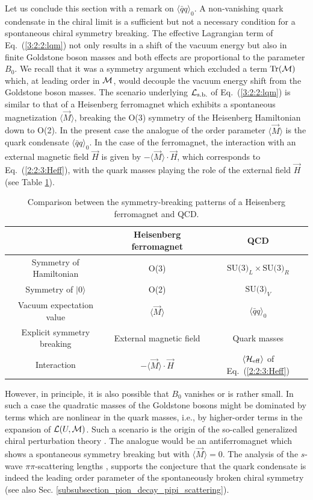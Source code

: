 \documentclass[twoside,12pt]{article}
\begin{document}
   Let us conclude this section with a remark on $\langle\bar{q}q\rangle_0$.
   A non-vanishing quark condensate in the chiral
limit is a sufficient but not a necessary condition for a spontaneous
chiral symmetry breaking.
   The effective Lagrangian term of Eq.\ (\ref{3:2:2:lqm}) not only results in
a shift of the vacuum energy but also in finite Goldstone boson
masses and both effects are proportional to the parameter
$B_0$.
   We recall that it was
a symmetry argument which excluded a term $\mbox{Tr}({\cal M})$ which,
at leading order in ${\cal M}$, would decouple the vacuum energy shift
from the Goldstone boson masses.
   The scenario underlying ${\cal L}_{\rm s.b.}$ of Eq.\ (\ref{3:2:2:lqm})
is similar to that of a Heisenberg ferromagnet which exhibits a
spontaneous magnetization $\langle \vec{M}\rangle$, breaking the
O(3) symmetry of the Heisenberg Hamiltonian down to O(2).
   In the present case the analogue of the order parameter
$\langle \vec{M}\rangle$ is the quark condensate $\langle \bar{q} q\rangle_0$.
   In the case of the ferromagnet, the interaction with an external magnetic
field $\vec{H}$ is given by $-\langle \vec{M}\rangle\cdot \vec{H}$, which corresponds
to Eq.\ (\ref{2:2:3:Heff}), with the quark masses playing the role of the
external field $\vec{H}$ (see Table \ref{3:2:2:table_analogy}).
\begin{table}[t]
\begin{center}
{\renewcommand{\baselinestretch}{1.5}\small\normalsize
\begin{tabular}{c|c|c}
& Heisenberg ferromagnet & QCD\\
\hline
Symmetry of Hamiltonian & O(3) & $\mbox{SU(3)}_L\times\mbox{SU(3)}_R$\\
Symmetry of $|0\rangle$ & O(2) & $\mbox{SU(3)}_V$\\
Vacuum expectation value & $\langle \vec{M}\rangle$ & $\langle
\bar{q} q\rangle_0$\\
Explicit symmetry breaking & External magnetic field & Quark
masses\\
Interaction &$-\langle \vec{M}\rangle\cdot \vec{H}$&$\langle{\cal
H}_{\rm eff}\rangle$ of Eq.~(\ref{2:2:3:Heff})
\end{tabular}
} \caption{\label{3:2:2:table_analogy} Comparison between the
symmetry-breaking patterns of a Heisenberg ferromagnet and QCD.}
\end{center}
\end{table}
   However, in principle, it is also possible that $B_0$ vanishes or is
rather small.
   In such a case  the quadratic masses of the Goldstone bosons might
be dominated by terms which are nonlinear in the quark masses, i.e., by
higher-order terms in the expansion of ${\cal L}(U,{\cal M})$.
   Such a scenario is the origin of the so-called generalized chiral
perturbation theory \cite{Knecht:1995tr:3}.
   The analogue would be an antiferromagnet which shows a spontaneous
symmetry breaking but with $\langle \vec{M}\rangle=0$.
    The analysis of the $s$-wave $\pi\pi$-scattering lengths
\cite{Colangelo:2000jc}, \cite{Colangelo:2001sp}
supports the conjecture that the quark condensate is indeed the leading order
parameter of the spontaneously broken chiral symmetry
(see also Sec. \ref{subsubsection_pion_decay_pipi_scattering}).
\end{document}
